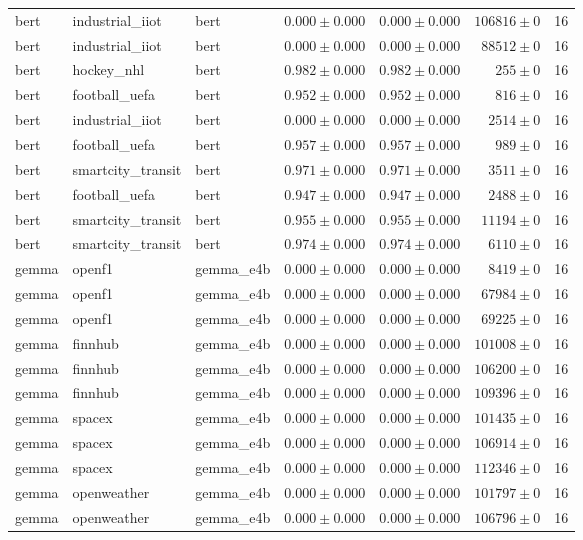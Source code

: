 \begin{table}[htbp]
\begin{tabular}{l l l r r r r}
bert & industrial\_iiot & bert & $0.000\pm0.000$ & $0.000\pm0.000$ & $106816\pm0$ & 16 \\
bert & industrial\_iiot & bert & $0.000\pm0.000$ & $0.000\pm0.000$ & $88512\pm0$ & 16 \\
bert & hockey\_nhl & bert & $0.982\pm0.000$ & $0.982\pm0.000$ & $255\pm0$ & 16 \\
bert & football\_uefa & bert & $0.952\pm0.000$ & $0.952\pm0.000$ & $816\pm0$ & 16 \\
bert & industrial\_iiot & bert & $0.000\pm0.000$ & $0.000\pm0.000$ & $2514\pm0$ & 16 \\
bert & football\_uefa & bert & $0.957\pm0.000$ & $0.957\pm0.000$ & $989\pm0$ & 16 \\
bert & smartcity\_transit & bert & $0.971\pm0.000$ & $0.971\pm0.000$ & $3511\pm0$ & 16 \\
bert & football\_uefa & bert & $0.947\pm0.000$ & $0.947\pm0.000$ & $2488\pm0$ & 16 \\
bert & smartcity\_transit & bert & $0.955\pm0.000$ & $0.955\pm0.000$ & $11194\pm0$ & 16 \\
bert & smartcity\_transit & bert & $0.974\pm0.000$ & $0.974\pm0.000$ & $6110\pm0$ & 16 \\
gemma & openf1 & gemma\_e4b & $0.000\pm0.000$ & $0.000\pm0.000$ & $8419\pm0$ & 16 \\
gemma & openf1 & gemma\_e4b & $0.000\pm0.000$ & $0.000\pm0.000$ & $67984\pm0$ & 16 \\
gemma & openf1 & gemma\_e4b & $0.000\pm0.000$ & $0.000\pm0.000$ & $69225\pm0$ & 16 \\
gemma & finnhub & gemma\_e4b & $0.000\pm0.000$ & $0.000\pm0.000$ & $101008\pm0$ & 16 \\
gemma & finnhub & gemma\_e4b & $0.000\pm0.000$ & $0.000\pm0.000$ & $106200\pm0$ & 16 \\
gemma & finnhub & gemma\_e4b & $0.000\pm0.000$ & $0.000\pm0.000$ & $109396\pm0$ & 16 \\
gemma & spacex & gemma\_e4b & $0.000\pm0.000$ & $0.000\pm0.000$ & $101435\pm0$ & 16 \\
gemma & spacex & gemma\_e4b & $0.000\pm0.000$ & $0.000\pm0.000$ & $106914\pm0$ & 16 \\
gemma & spacex & gemma\_e4b & $0.000\pm0.000$ & $0.000\pm0.000$ & $112346\pm0$ & 16 \\
gemma & openweather & gemma\_e4b & $0.000\pm0.000$ & $0.000\pm0.000$ & $101797\pm0$ & 16 \\
gemma & openweather & gemma\_e4b & $0.000\pm0.000$ & $0.000\pm0.000$ & $106796\pm0$ & 16 \\

\end{tabular}
\end{table}
